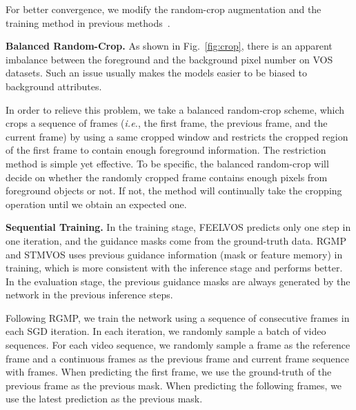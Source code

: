 \documentclass[runningheads]{llncs}
\def\ie{\emph{i.e.}}
\newcommand{\zongxin}[1]{#1}
\begin{document}
For better convergence, we modify the random-crop augmentation and the training method in previous methods~\cite{spacetime,feelvos}.

\setlength{\intextsep}{0pt}

\noindent\textbf{Balanced Random-Crop.}
As shown in Fig.~\ref{fig:crop}, there is an apparent imbalance between the foreground and the background pixel number on VOS datasets. Such an issue usually makes the models easier to be biased to background attributes. 

In order to relieve this problem, we take a balanced random-crop scheme, which crops a sequence of frames (\ie, the first frame, the previous frame, and the current frame) by using a same cropped window and restricts the cropped region of the first frame to contain enough foreground information. The restriction method is simple yet effective. To be specific, the balanced random-crop will decide on whether the randomly cropped frame contains enough pixels from foreground objects or not. If not, the method will continually take the cropping operation until we obtain an expected one.

\iffalse
\begin{figure}[!t]
    \center
        \texttt{[image: figs/sequence\_training.pdf]}
        \caption{An illustration of the sequential training. In each step, the previous mask comes from the previous prediction (the green lines) except for the first step, whose previous mask comes from the ground-truth mask (the blue line).}
        \label{fig:sequence_training}
\end{figure}
\fi

\noindent\textbf{Sequential Training.} \zongxin{In the training stage, FEELVOS predicts only one step in one iteration, and the guidance masks come from the ground-truth data. RGMP and STMVOS uses previous guidance information (mask or feature memory) in training, which is more consistent with the inference stage and performs better. In the evaluation stage, the previous guidance masks are always generated by the network in the previous inference steps.}

\zongxin{Following RGMP, we train the network using a sequence of consecutive frames in each SGD iteration. 
In each iteration, we randomly sample a batch of video sequences. For each video sequence, we randomly sample a frame as the reference frame and a continuous  frames as the previous frame and current frame sequence with  frames. When predicting the first frame, we use the ground-truth of the previous frame as the previous mask. When predicting the following frames, we use the latest prediction as the previous mask. 
}
\end{document}
